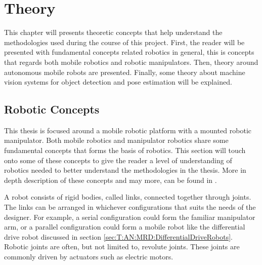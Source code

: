 \chapter{Theory}
This chapter will presents theoretic concepts that help understand the methodologies used during the course of this project. First, the reader will be presented with fundamental concepts related robotics in general, this is concepts that regards both mobile robotics and robotic manipulators. Then, theory around autonomous mobile robots are presented. Finally, some theory about machine vision systems for object detection and pose estimation will be explained. 


\section{Robotic Concepts}
This thesis is focused around a mobile robotic platform with a mounted robotic manipulator. Both mobile robotics and manipulator robotics share some fundamental concepts that forms the basis of robotics. This section will touch onto some of these concepts to give the reader a level of understanding of robotics needed to better understand the methodologies in the thesis. More in depth description of these concepts and may more, can be found in \cite{LynchKevin2017Mr:m}.

A robot consists of rigid bodies, called links, connected together through joints. The links can be arranged in whichever configurations that suits the needs of the designer. For example, a serial configuration could form the familiar manipulator arm, or a parallel configuration could form a mobile robot like the differential drive robot discussed in section \ref{sec:T:AN:MRD:DifferentialDriveRobots}. Robotic joints are often, but not limited to, revolute joints. These joints are commonly driven by actuators such as electric motors.

